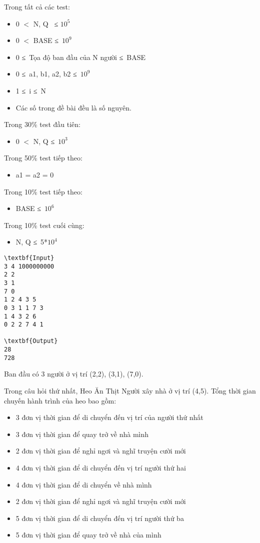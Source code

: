 Trong tất cả các test:  
\begin{itemize}
	\item     0 $<$ N, Q  ≤ $10^{5}$
	\item     0 $<$ BASE ≤ $10^{9}$
	\item     0 ≤ Tọa độ ban đầu của N người ≤ BASE   
	\item     0 ≤ a1, b1, a2, b2 ≤ $10^{9}$
	\item     1 ≤ i ≤ N   
	\item     Các số trong đề bài đều là số nguyên.   
\end{itemize}

   Trong 30\% test đầu tiên:  
\begin{itemize}
	\item     0 $<$ N, Q ≤ $10^{3}$
\end{itemize}

   Trong 50\% test tiếp theo:  
\begin{itemize}
	\item     a1 = a2 = 0   
\end{itemize}

   Trong 10\% test tiếp theo:  
\begin{itemize}
	\item     BASE ≤ $10^{6}$
\end{itemize}

   Trong 10\% test cuối cùng:  
\begin{itemize}
	\item     N, Q ≤ 5*$10^{4}$
\end{itemize}
\begin{verbatim}
\textbf{Input}
3 4 1000000000
2 2
3 1
7 0
1 2 4 3 5
0 3 1 1 7 3
1 4 3 2 6
0 2 2 7 4 1

\textbf{Output}
28
728\end{verbatim}
Ban đầu có 3 người ở vị trí (2,2), (3,1), (7,0).  

   Trong câu hỏi thứ nhất, Heo Ăn Thịt Người xây nhà ở vị trí (4,5). Tổng thời gian chuyến hành trình của heo bao gồm:  
\begin{itemize}
	\item     3 đơn vị thời gian để di chuyển đến vị trí của người thứ nhất   
	\item     3 đơn vị thời gian để quay trở về nhà mình   
	\item     2 đơn vị thời gian để nghỉ ngơi và nghĩ truyện cười mới   
	\item     4 đơn vị thời gian để di chuyển đến vị trí người thứ hai   
	\item     4 đơn vị thời gian để di chuyển về nhà mình   
	\item     2 đơn vị thời gian để nghỉ ngơi và nghĩ truyện cười mới   
	\item     5 đơn vị thời gian để di chuyển đến vị trí người thứ ba   
	\item     5 đơn vị thời gian để quay trở về nhà của mình   
\end{itemize}

